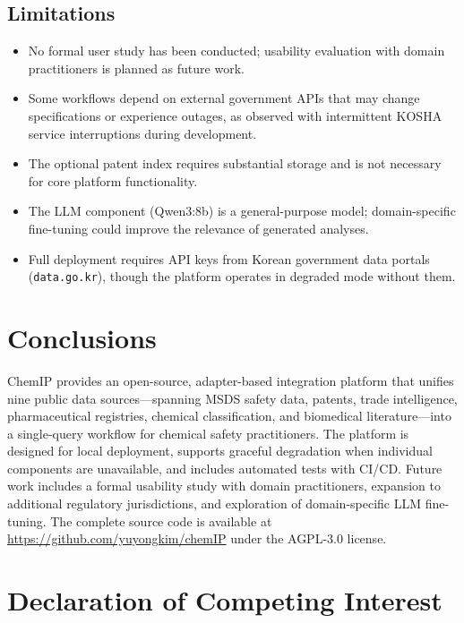 \documentclass[preprint,12pt]{elsarticle}
\begin{document}
\subsection{Limitations}

\begin{itemize}
  \item No formal user study has been conducted; usability evaluation with domain practitioners is planned as future work.
  \item Some workflows depend on external government APIs that may change specifications or experience outages, as observed with intermittent KOSHA service interruptions during development.
  \item The optional patent index requires substantial storage and is not necessary for core platform functionality.
  \item The LLM component (Qwen3:8b) is a general-purpose model; domain-specific fine-tuning could improve the relevance of generated analyses.
  \item Full deployment requires API keys from Korean government data portals (\texttt{data.go.kr}), though the platform operates in degraded mode without them.
\end{itemize}

\section{Conclusions}
\label{sec:conclusions}

ChemIP provides an open-source, adapter-based integration platform that unifies nine public data sources---spanning MSDS safety data, patents, trade intelligence, pharmaceutical registries, chemical classification, and biomedical literature---into a single-query workflow for chemical safety practitioners.
The platform is designed for local deployment, supports graceful degradation when individual components are unavailable, and includes automated tests with CI/CD.
Future work includes a formal usability study with domain practitioners, expansion to additional regulatory jurisdictions, and exploration of domain-specific LLM fine-tuning.
The complete source code is available at \url{https://github.com/yuyongkim/chemIP} under the AGPL-3.0 license.

\section*{Declaration of Competing Interest}
\end{document}
